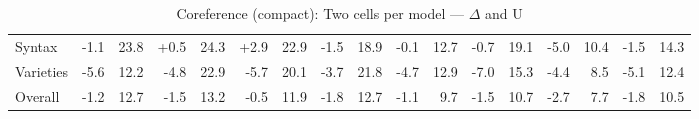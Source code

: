 \begin{table}[h]
{\begin{tabular}{lrrrrrrrrrrrrrrrr}
Syntax & \cellcolor{red!2} -1.1 & \cellcolor{blue!19} 23.8 & \cellcolor{green!1} +0.5 & \cellcolor{blue!19} 24.3 & \cellcolor{green!5} +2.9 & \cellcolor{blue!18} 22.9 & \cellcolor{red!2} -1.5 & \cellcolor{blue!15} 18.9 & \cellcolor{red!0} -0.1 & \cellcolor{blue!10} 12.7 & \cellcolor{red!1} -0.7 & \cellcolor{blue!15} 19.1 & \cellcolor{red!10} -5.0 & \cellcolor{blue!8} 10.4 & \cellcolor{red!2} -1.5 & \cellcolor{blue!11} 14.3 \\
Varieties & \cellcolor{red!11} -5.6 & \cellcolor{blue!9} 12.2 & \cellcolor{red!9} -4.8 & \cellcolor{blue!18} 22.9 & \cellcolor{red!11} -5.7 & \cellcolor{blue!16} 20.1 & \cellcolor{red!7} -3.7 & \cellcolor{blue!17} 21.8 & \cellcolor{red!9} -4.7 & \cellcolor{blue!10} 12.9 & \cellcolor{red!14} -7.0 & \cellcolor{blue!12} 15.3 & \cellcolor{red!8} -4.4 & \cellcolor{blue!6} 8.5 & \cellcolor{red!10} -5.1 & \cellcolor{blue!9} 12.4 \\
Overall & \cellcolor{red!2} -1.2 & \cellcolor{blue!10} 12.7 & \cellcolor{red!3} -1.5 & \cellcolor{blue!10} 13.2 & \cellcolor{red!1} -0.5 & \cellcolor{blue!9} 11.9 & \cellcolor{red!3} -1.8 & \cellcolor{blue!10} 12.7 & \cellcolor{red!2} -1.1 & \cellcolor{blue!7} 9.7 & \cellcolor{red!2} -1.5 & \cellcolor{blue!8} 10.7 & \cellcolor{red!5} -2.7 & \cellcolor{blue!6} 7.7 & \cellcolor{red!3} -1.8 & \cellcolor{blue!8} 10.5 \\
\bottomrule
\end{tabular}}
\caption{Coreference (compact): Two cells per model — $\Delta$ and U}\label{tab:coref_compact_combined_cells}
\end{table}